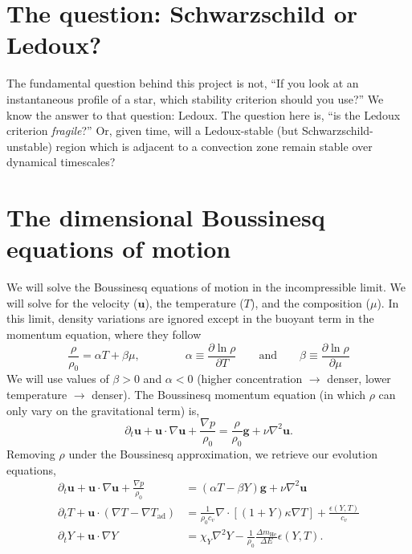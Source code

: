 \documentclass[onecolumn, amsmath, amsfonts, amssymb]{aastex62}
\newcommand{\grad}{\ensuremath{\nabla}}
\renewcommand{\vec}[1]{\ensuremath{\mathbf{#1}}}
\renewcommand{\dot}{\ensuremath{\cdot}}
\begin{document}
\section{The question: Schwarzschild or Ledoux?}
The fundamental question behind this project is not, ``If you look at an instantaneous profile of a star, which stability criterion should you use?''
We know the answer to that question: Ledoux.
The question here is, ``is the Ledoux criterion \emph{fragile}?''
Or, given time, will a Ledoux-stable (but Schwarzschild-unstable) region which is adjacent to a convection zone remain stable over dynamical timescales?

\section{The dimensional Boussinesq equations of motion}
We will solve the Boussinesq equations of motion in the incompressible limit.
We will solve for the velocity (\vec{u}), the temperature ($T$), and the composition ($\mu$).
In this limit, density variations are ignored except in the buoyant term in the momentum equation, where they follow
\begin{equation}
\frac{\rho}{\rho_0} = \alpha T + \beta \mu,\qquad\qquad
\alpha \equiv \frac{\partial\ln\rho}{\partial T} \qquad\mathrm{and}\qquad
\beta  \equiv \frac{\partial\ln\rho}{\partial \mu}
\end{equation}
We will use values of $\beta > 0$ and $\alpha < 0$ (higher concentration $\rightarrow$ denser, lower temperature $\rightarrow$ denser).
The Boussinesq momentum equation (in which $\rho$ can only vary on the gravitational term) is,
\begin{equation}
\partial_t \vec{u} + \vec{u}\dot\grad\vec{u} + \frac{\grad p}{\rho_0} = \frac{\rho}{\rho_0}\vec{g} + \nu\grad^2\bm{u}.
\end{equation}
Removing $\rho$ under the Boussinesq approximation, we retrieve our evolution equations,
\begin{align}
\partial_t \vec{u} + \vec{u}\dot\grad\vec{u} + \frac{\grad p}{\rho_0} &= (\alpha T - \beta Y)\vec{g} + \nu \grad^2\vec{u} \\
\partial_t T + \vec{u}\dot(\grad T - \grad T_{\mathrm{ad}}) &= \frac{1}{\rho_0 c_v}\grad\dot[(1 + Y)\kappa\grad T] + \frac{\epsilon(Y, T)}{c_v} \label{eqn:temperature_eqn} \\
\partial_t Y + \vec{u}\dot\grad Y &= \chi_Y \grad^2 Y - \frac{1}{\rho_0}\frac{\Delta m_{\mathrm{He}}}{\Delta E}\epsilon(Y, T).
\end{align}
\end{document}
